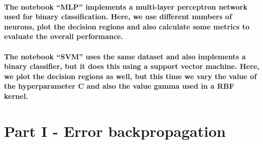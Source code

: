 \documentclass[a4paper]{article}    %
\begin{document}
\paragraph{The notebook ``MLP'' implements a multi-layer perceptron network used for binary classification. Here, we use different numbers of neurons, plot the decision regions and also calculate some metrics to evaluate the overall performance.}

\paragraph{The notebook ``SVM'' uses the same dataset and also implements a binary classifier, but it does this using a support vector machine. Here, we plot the decision regions as well, but this time we vary the value of the hyperparameter C and also the value gamma used in a RBF kernel.}

\bigskip

\section{Part I - Error backpropagation}
\end{document}
